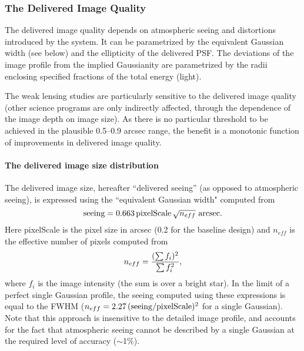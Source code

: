 


\subsubsection{        The Delivered Image Quality       }

The delivered image quality depends on atmospheric seeing and distortions
introduced by the system. It can be parametrized by the equivalent Gaussian
width (see below) and the ellipticity of the delivered PSF.  The deviations
of the image profile from the implied Gaussianity are parametrized by the
radii enclosing specified fractions of the total energy (light).

The weak lensing studies are particularly sensitive to the delivered image
quality (other science programs are only indirectly affected, \eg
through the dependence of the image depth on image size). As there is no
particular threshold to be achieved in the plausible 0.5--0.9 arcsec range,
the benefit is a monotonic function of improvements in delivered image
quality.


\paragraph{The delivered image size distribution\\}


The delivered image size, hereafter ``delivered seeing'' (as opposed to
atmospheric seeing), is expressed using the ``equivalent Gaussian width"
computed from
\begin{equation}
      {\rm seeing} = 0.663 \, {\rm pixelScale} \, \sqrt{n_{eff}} \,\,{\rm arcsec}.
\end{equation}
Here pixelScale is the pixel size in arcsec (0.2 for the baseline
design) and $n_{eff}$ is the effective number of pixels computed from
\begin{equation}
        n_{eff}  = {(\sum f_i)^2 \over \sum f_i^2},
\end{equation}
where $f_i$ is the image intensity (\ie the sum is over a bright
star).  In the limit of a perfect single Gaussian profile, the seeing computed
using these expressions is equal to the FWHM
($n_{eff}=2.27\,({\rm seeing/pixelScale})^2$ for a single Gaussian). Note that
this approach is insensitive to the detailed image profile, and accounts
for the fact that atmospheric seeing cannot be described by a single
Gaussian at the required level of accuracy ($\sim$1\%).

